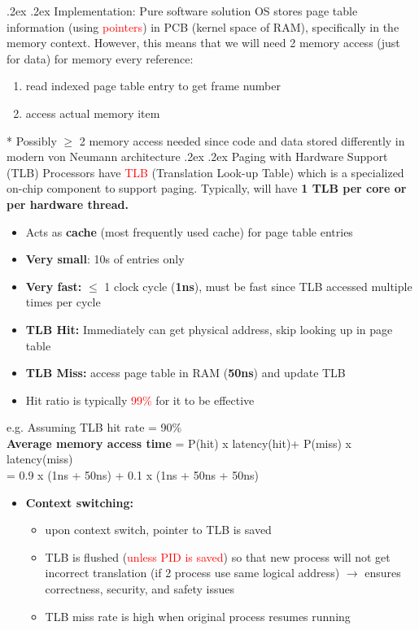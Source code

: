 \documentclass[13pt,landscape,a4paper]{article}
\makeatletter
\newcommand\red[1]{\textcolor{red}{#1}}
\renewcommand{\subsubsection}{\@startsection{subsubsection}{1}{0mm}%
    {.2ex}%
    {.2ex}%
    {\rmfamily\bfseries}}
\makeatother
\begin{document}
\begin{multicols*}{3}
        \subsubsection{Implementation: Pure software solution}
        OS stores page table information (using \red{pointers}) in PCB (kernel space of RAM), specifically in the memory context. However, this means that we will need 2 memory access (just for data) for memory every reference:
        \begin{enumerate}
            \item read indexed page table entry to get frame number
            \item access actual memory item
        \end{enumerate}
        * Possibly $\geq$ 2 memory access needed since code and data stored differently in modern von Neumann architecture
        \subsubsection{Paging with Hardware Support (TLB)}
        Processors have \red{TLB} (Translation Look-up Table) which is a specialized on-chip component to support paging. Typically, will have \textbf{1 TLB per core or per hardware thread.}
        \begin{itemize}
            \item Acts as \textbf{cache} (most frequently used cache) for page table entries
            \item \textbf{Very small}: 10s of entries only
            \item \textbf{Very fast: }$\le$ 1 clock cycle (\textbf{1ns}), must be fast since TLB accessed multiple times per cycle
            \item \textbf{TLB Hit: }Immediately can get physical address, skip looking up in page table
            \item \textbf{TLB Miss: }access page table in RAM (\textbf{50ns}) and update TLB
            \item Hit ratio is typically \red{99\%} for it to be effective
        \end{itemize}
        e.g. Assuming TLB hit rate = 90\%\\
        \textbf{Average memory access time }
        = P(hit) x latency(hit)+ P(miss) x latency(miss)\\
        = 0.9 x (1ns + 50ns) + 0.1 x (1ns + 50ns + 50ns)
        \begin{itemize}
            \item \textbf{Context switching:}
            \begin{itemize}
                \item upon context switch, pointer to TLB is saved
                \item TLB is flushed (\red{unless PID is saved}) so that new process will not get incorrect translation (if 2 process use same logical address) $\rightarrow$ ensures correctness, security, and safety issues
                \item TLB miss rate is high when original process resumes running
            \end{itemize}
        \end{itemize}

\end{multicols*}
\end{document}
